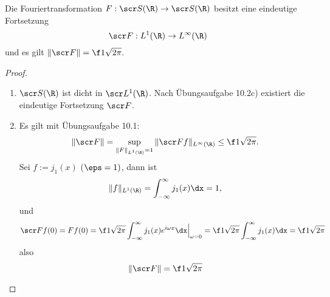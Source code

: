 \begin{st} \label{4.24}
	Die Fouriertransformation $F: \scr S(\R) \to \scr S(\R)$ besitzt eine eindeutige Fortsetzung
	\[
		\scr F: L^1(\R) \to L^\infty(\R)
	\]
	und es gilt $\|\scr F\| = \f 1{\sqrt{2\pi}}$.
	\begin{proof}
		\begin{enumerate}[1)]
			\item
				$\scr S(\R)$ ist dicht in $\scr L^1(\R)$.
				Nach Übungsaufgabe 10.2c) existiert die eindeutige Fortsetzung $\scr F$.
			\item
				Es gilt mit Übungsaufgabe 10.1:
				\[
					\| \scr F\| = \sup_{\|F\|_{L^1(\R)}=1} \|\scr F f\|_{L^\infty(\R)} \le \f 1{\sqrt{2\pi}}.
				\]
				Sei $f := j_1(x)$ ($\eps = 1)$, dann ist
				\[
					\|f\|_{L^1(\R)} = \int_{-\infty}^\infty j_1(x) \dx = 1,
				\]
				und
				\[
					\scr F f(0) 
					= F f(0) 
					= \f 1{\sqrt{2\pi}} \int_{-\infty}^\infty j_1(x) e^{i\omega x} \dx \Big|_{\omega = 0}
					= \f 1{\sqrt{2\pi}} \int_{-\infty}^\infty j_1(x) \dx
					= \f 1{\sqrt{2\pi}}
				\]
				also
				\[
					\| \scr F\| = \f 1{\sqrt{2\pi}}
				\]
		\end{enumerate}
	\end{proof}
\end{st}

